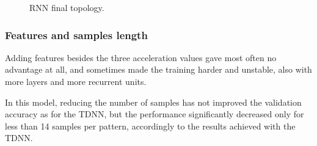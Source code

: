 \begin{center}
	\begin{figure}[ht!]
		\caption{RNN final topology.}
	\end{figure}
\end{center}

\subsubsection{Features and samples length}
Adding features besides the three acceleration values gave most often no advantage at all, and sometimes made the training harder and unstable, also with more layers and more recurrent units.

In this model, reducing the number of samples has not improved the validation accuracy as for the TDNN, but the performance significantly decreased only for less than 14 samples per pattern, accordingly to the results achieved with the TDNN.

